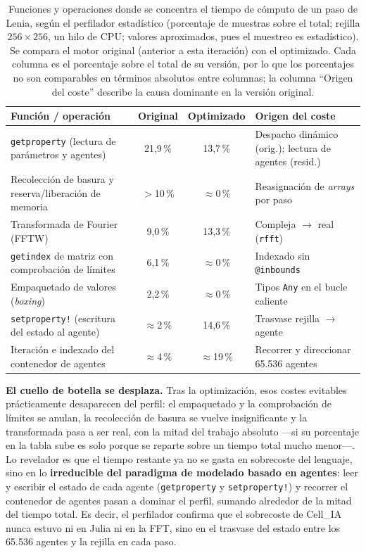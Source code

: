 \documentclass[runningheads]{llncs}
\begin{document}
\begin{table}[H]
\centering
\caption{Funciones y operaciones donde se concentra el tiempo de cómputo de un
paso de Lenia, según el perfilador estadístico (porcentaje de muestras sobre el
total; rejilla $256\times256$, un hilo de CPU; valores aproximados, pues el
muestreo es estadístico). Se compara el motor original (anterior a esta
iteración) con el optimizado. Cada columna es el porcentaje sobre el total de su
versión, por lo que los porcentajes no son comparables en términos absolutos
entre columnas; la columna ``Origen del coste'' describe la causa dominante en
la versión original.}
\label{tab:profiling_lenia}
\begin{tabular}{@{}lccl@{}}
\toprule
\textbf{Función / operación} & \textbf{Original} & \textbf{Optimizado} & \textbf{Origen del coste} \\ \midrule
\texttt{getproperty} (lectura de parámetros y agentes) & 21{,}9\,\% & 13{,}7\,\% & Despacho dinámico (orig.); lectura de agentes (resid.) \\
Recolección de basura y reserva/liberación de memoria   & $>$10\,\% & $\approx$0\,\% & Reasignación de \textit{arrays} por paso \\
Transformada de Fourier (FFTW)                          & 9{,}0\,\% & 13{,}3\,\% & Compleja $\rightarrow$ real (\texttt{rfft}) \\
\texttt{getindex} de matriz con comprobación de límites & 6{,}1\,\% & $\approx$0\,\% & Indexado sin \texttt{@inbounds} \\
Empaquetado de valores (\textit{boxing})                & 2{,}2\,\% & $\approx$0\,\% & Tipos \texttt{Any} en el bucle caliente \\
\texttt{setproperty!} (escritura del estado al agente)  & $\approx$2\,\% & 14{,}6\,\% & Trasvase rejilla $\rightarrow$ agente \\
Iteración e indexado del contenedor de agentes          & $\approx$4\,\% & $\approx$19\,\% & Recorrer y direccionar 65.536 agentes \\ \bottomrule
\end{tabular}
\end{table}

\textbf{El cuello de botella se desplaza.}
Tras la optimización, esos costes evitables prácticamente desaparecen del perfil:
el empaquetado y la comprobación de límites se anulan, la recolección de basura
se vuelve insignificante y la transformada pasa a ser real, con la mitad del
trabajo absoluto —si su porcentaje en la tabla sube es solo porque se reparte
sobre un tiempo total mucho menor—. Lo revelador es que el tiempo restante ya no se gasta en sobrecoste del
lenguaje, sino en lo \textbf{irreducible del paradigma de modelado basado en
agentes}: leer y escribir el estado de cada agente (\texttt{getproperty} y
\texttt{setproperty!}) y recorrer el contenedor de agentes pasan a dominar el
perfil, sumando alrededor de la mitad del tiempo total. Es decir, el perfilador
confirma que el sobrecoste de Cell\_IA nunca estuvo ni en Julia ni en la FFT,
sino en el trasvase del estado entre los 65.536 agentes y la rejilla en cada
paso.
\end{document}
